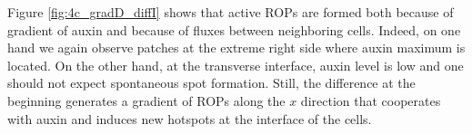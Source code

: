 %
Figure \ref{fig:4c_gradD_diffI} shows that active ROPs are formed both because of gradient of auxin and because of fluxes between neighboring cells. Indeed, on one hand we again observe patches at the extreme right side where auxin maximum is located. On the other hand, at the transverse interface, auxin level is low and one should not expect spontaneous spot formation. Still, the difference at the beginning generates a gradient of ROPs along the $x$ direction that cooperates with auxin and induces new hotspots at the interface of the cells.

